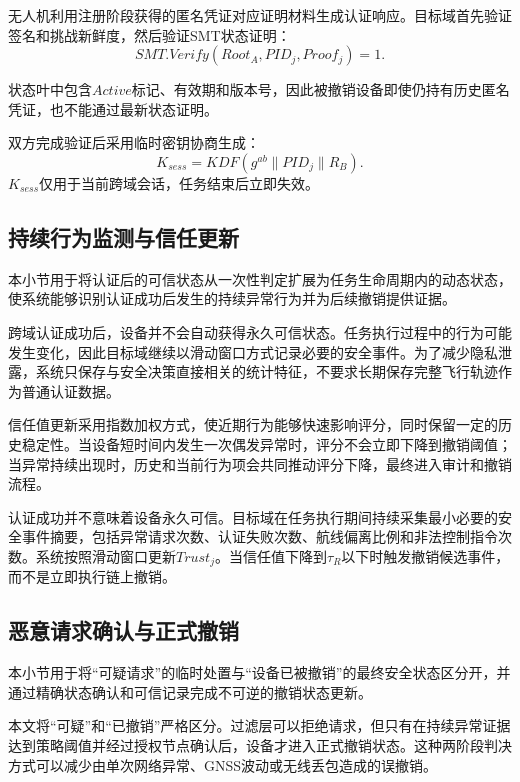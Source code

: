 \documentclass[conference]{IEEEtran}
\begin{document}
	无人机利用注册阶段获得的匿名凭证对应证明材料生成认证响应。目标域首先验证签名和挑战新鲜度，然后验证SMT状态证明：
	\begin{equation}
		SMT.Verify(Root_A,PID_j,Proof_j)=1.
	\end{equation}
	
	状态叶中包含$Active$标记、有效期和版本号，因此被撤销设备即使仍持有历史匿名凭证，也不能通过最新状态证明。
	
	双方完成验证后采用临时密钥协商生成：
	\begin{equation}
		K_{sess}=KDF(g^{ab}\parallel PID_j\parallel R_B).
	\end{equation}
	$K_{sess}$仅用于当前跨域会话，任务结束后立即失效。
	
	\subsection{持续行为监测与信任更新}
	
	本小节用于将认证后的可信状态从一次性判定扩展为任务生命周期内的动态状态，使系统能够识别认证成功后发生的持续异常行为并为后续撤销提供证据。
	
	跨域认证成功后，设备并不会自动获得永久可信状态。任务执行过程中的行为可能发生变化，因此目标域继续以滑动窗口方式记录必要的安全事件。为了减少隐私泄露，系统只保存与安全决策直接相关的统计特征，不要求长期保存完整飞行轨迹作为普通认证数据。
	
	信任值更新采用指数加权方式，使近期行为能够快速影响评分，同时保留一定的历史稳定性。当设备短时间内发生一次偶发异常时，评分不会立即下降到撤销阈值；当异常持续出现时，历史和当前行为项会共同推动评分下降，最终进入审计和撤销流程。
	
	认证成功并不意味着设备永久可信。目标域在任务执行期间持续采集最小必要的安全事件摘要，包括异常请求次数、认证失败次数、航线偏离比例和非法控制指令次数。系统按照滑动窗口更新$Trust_j$。当信任值下降到$\tau_R$以下时触发撤销候选事件，而不是立即执行链上撤销。
	
	\subsection{恶意请求确认与正式撤销}
	
	本小节用于将“可疑请求”的临时处置与“设备已被撤销”的最终安全状态区分开，并通过精确状态确认和可信记录完成不可逆的撤销状态更新。
	
	本文将“可疑”和“已撤销”严格区分。过滤层可以拒绝请求，但只有在持续异常证据达到策略阈值并经过授权节点确认后，设备才进入正式撤销状态。这种两阶段判决方式可以减少由单次网络异常、GNSS波动或无线丢包造成的误撤销。
	
\end{document}
